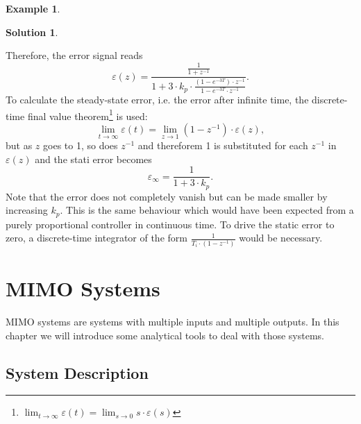 \documentclass[a4paper,12 pt]{article}
\numberwithin{equation}{section}
\theoremstyle{definition}
\newtheorem{bsp}{Example}
\theoremstyle{remark}
\theoremstyle{definition}
\newtheorem*{lsg}{Solution}
\theoremstyle{definition}
\theoremstyle{definition}
\theoremstyle{remark}
\begin{document}
\begin{bsp}
\begin{lsg}
\begin{enumerate}[(a)]
\begin{equation*}
\end{equation*}
Therefore, the error signal reads
\begin{equation*}
\varepsilon(z)=\frac{\frac{1}{1+z^{-1}}}{1+3\cdot k_p \cdot \frac{(1-e^{-3T})\cdot z^{-1}}{1-e^{-3T}\cdot z^{-1}}}.
\end{equation*}
To calculate the steady-state error, i.e. the error after infinite time, the discrete-time final value theorem\footnote{$\lim_{t\rightarrow \infty}\varepsilon (t)=\lim_{s\rightarrow 0}s\cdot \varepsilon (s)$} is used:
\begin{equation*}
\lim_{t\rightarrow \infty}\varepsilon (t)=\lim_{z\rightarrow 1}(1-z^{-1})\cdot \varepsilon(z),
\end{equation*}
but as $z$ goes to 1, so does $z^{-1}$ and thereforem 1 is substituted for each $z^{-1}$ in $\varepsilon (z)$ and the stati error becomes
\begin{equation*}
\varepsilon_\infty =\frac{1}{1+3\cdot k_p}.
\end{equation*}
Note that the error does not completely vanish but can be made smaller by increasing $k_p$. This is the same behaviour which would have been expected from a purely proportional controller in continuous time. To drive the static error to zero, a discrete-time integrator of the form $\frac{1}{T_i\cdot (1-z^{-1})}$ would be necessary.
\end{enumerate}

\end{lsg}
\newpage

\end{bsp}

\section{MIMO Systems}
MIMO systems are systems with multiple inputs and multiple outputs. In this chapter we will introduce some analytical tools to deal with those systems.
\subsection{System Description}
\end{document}
